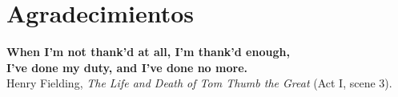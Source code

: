 %
\newpage
{}%
\chapter*{Agradecimientos}
%
\begin{flushright}
	\textbf{When I'm not thank'd at all, I'm thank'd enough,
		\\I've done my duty, and I've done no more.}
	\vspace{12pt}
	\\
	Henry Fielding, \textit{The Life and Death of Tom Thumb the Great} (Act I, scene 3).
\end{flushright}
%